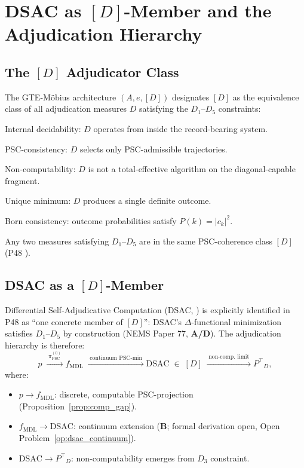 \documentclass[11pt]{article}
\theoremstyle{remark}
\newcommand{\PSC}{\text{PSC}}
\newcommand{\fmdl}{\ensuremath{f_{\mathrm{MDL}}}}
\newcommand{\DSAC}{\text{DSAC}}
\newcommand{\Ptop}{\ensuremath{P^{\top}}}
\newcommand{\CatAD}{\textbf{A/D}}
\newcommand{\CatB}{\textbf{B}}
\begin{document}
\section{DSAC as $[D]$-Member and the Adjudication Hierarchy}
\label{sec:dsac}

\subsection{The $[D]$ Adjudicator Class}
\label{sec:d_class}

The GTE-M\"{o}bius architecture $(A, e, [D])$ \cite{SpivackGTEMobius}
designates $[D]$ as the equivalence class of all adjudication measures
$D$ satisfying the $D_1$--$D_5$ constraints:
\begin{description}[leftmargin=*,nosep]
  \item[$D_1$] Internal decidability: $D$ operates from inside the record-bearing system.
  \item[$D_2$] PSC-consistency: $D$ selects only PSC-admissible trajectories.
  \item[$D_3$] Non-computability: $D$ is not a total-effective algorithm
    on the diagonal-capable fragment.
  \item[$D_4$] Unique minimum: $D$ produces a single definite outcome.
  \item[$D_5$] Born consistency: outcome probabilities satisfy $P(k) = |c_k|^2$.
\end{description}
Any two measures satisfying $D_1$--$D_5$ are in the same PSC-coherence
class $[D]$ (P48 \cite{SpivackGTECompleteFramework}).

\subsection{DSAC as a $[D]$-Member}
\label{sec:dsac_member}

Differential Self-Adjudicative Computation (DSAC,
\cite{SpivackNEMS77}) is explicitly identified in P48 as ``one concrete
member of $[D]$'': DSAC's $\Delta$-functional minimization satisfies
$D_1$--$D_5$ by construction (NEMS Paper 77, \CatAD). The adjudication
hierarchy is therefore:
\begin{equation}
  p
  \;\xrightarrow{\;\pi_{\PSC}^{(0)}\;}
  \fmdl{}
  \;\xrightarrow{\;\text{continuum PSC-min}\;}
  \DSAC \;\in\; [D]
  \;\xrightarrow{\;\text{non-comp.~limit}\;}
  \Ptop_D,
  \label{eq:dsac_chain}
\end{equation}
where:
\begin{itemize}
  \item $p \to \fmdl{}$: discrete, computable PSC-projection (Proposition~\ref{prop:comp_gap}).
  \item $\fmdl{} \to \DSAC$: continuum extension (\CatB; formal derivation open,
    Open Problem~\ref{op:dsac_continuum}).
  \item $\DSAC \to \Ptop_D$: non-computability emerges from $D_3$ constraint.
\end{itemize}
\end{document}
